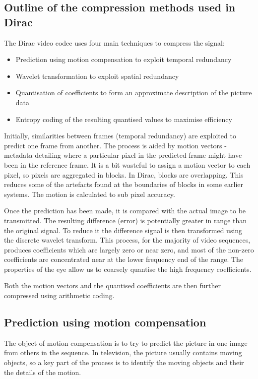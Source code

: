 \subsection{Outline of the compression methods used in Dirac}
The Dirac video codec uses four main techniques to compress the signal:

\begin{itemize}
    \item Prediction using motion compensation to exploit temporal redundancy
    \item Wavelet transformation to exploit spatial redundancy
    \item Quantisation of coefficients to form an approximate description of the picture data
    \item Entropy coding of the resulting quantised values to maximise efficiency
\end{itemize}


Initially, similarities between frames (temporal redundancy) are
exploited to predict one frame from another. The process is aided by
motion vectors - metadata detailing where a particular pixel in the
predicted frame might have been in the reference frame. It is a bit
wasteful to assign a motion vector to each pixel, so pixels are
aggregated in blocks. In Dirac, blocks are overlapping. This reduces
some of the artefacts found at the boundaries of blocks in some earlier
systems. The motion is calculated to sub pixel accuracy.

Once the prediction has been made, it is compared with the actual image
to be transmitted.  The resulting difference (error) is potentially
greater in range than the original signal. To reduce it the difference
signal is then transformed using the discrete wavelet transform. This
process, for the majority of video sequences, produces coefficients
which are largely zero or near zero, and most of the non-zero
coefficients are concentrated near at the lower frequency end of the
range. The properties of the eye allow us to coarsely quantise the high
frequency coefficients.

Both the motion vectors and the quantised coefficients are then further
compressed using arithmetic coding.

\subsection{Prediction using motion compensation}

The object of motion compensation is to try to predict the picture in
one image from others in the sequence. In television, the picture
usually contains moving objects, so a key part of the process is to
identify the moving objects and their the details of the motion.

